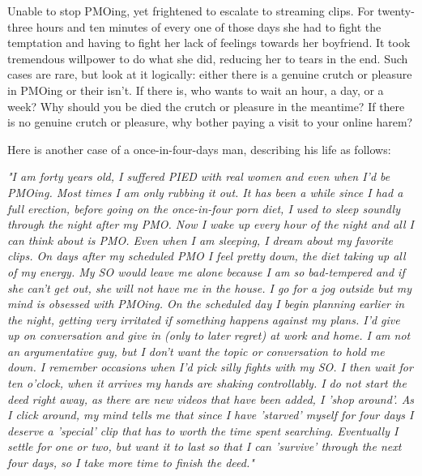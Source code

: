 \documentclass[easypeasy]{subfiles}
\begin{document}
Unable to stop PMOing, yet frightened to escalate to streaming clips. For twenty-three hours and ten minutes of every one of those days she had to fight the temptation and having to fight her lack of feelings towards her boyfriend. It took tremendous willpower to do what she did, reducing her to tears in the end. Such cases are rare, but look at it logically: either there is a genuine crutch or pleasure in PMOing or their isn't. If there is, who wants to wait an hour, a day, or a week? Why should you be died the crutch or pleasure in the meantime? If there is no genuine crutch or pleasure, why bother paying a visit to your online harem?

  Here is another case of a once-in-four-days man, describing his life as follows:

  \textit{"I am forty years old, I suffered PIED with real women and even when I'd be PMOing. Most times I am only rubbing it out. It has been a while since I had a full erection, before going on the once-in-four porn diet, I used to sleep soundly through the night after my PMO. Now I wake up every hour of the night and all I can think about is PMO. Even when I am sleeping, I dream about my favorite clips. On days after my scheduled PMO I feel pretty down, the diet taking up all of my energy. My SO would leave me alone because I am so bad-tempered and if she can't get out, she will not have me in the house. I go for a jog outside but my mind is obsessed with PMOing. On the scheduled day I begin planning earlier in the night, getting very irritated if something happens against my plans. I'd give up on conversation and give in (only to later regret) at work and home. I am not an argumentative guy, but I don't want the topic or conversation to hold me down. I remember occasions when I'd pick silly fights with my SO. I then wait for ten o'clock, when it arrives my hands are shaking controllably. I do not start the deed right away, as there are new videos that have been added, I 'shop around'. As I click around, my mind tells me that since I have 'starved' myself for four days I deserve a 'special' clip that has to worth the time spent searching. Eventually I settle for one or two, but want it to last so that I can 'survive' through the next four days, so I take more time to finish the deed."}
\end{document}
